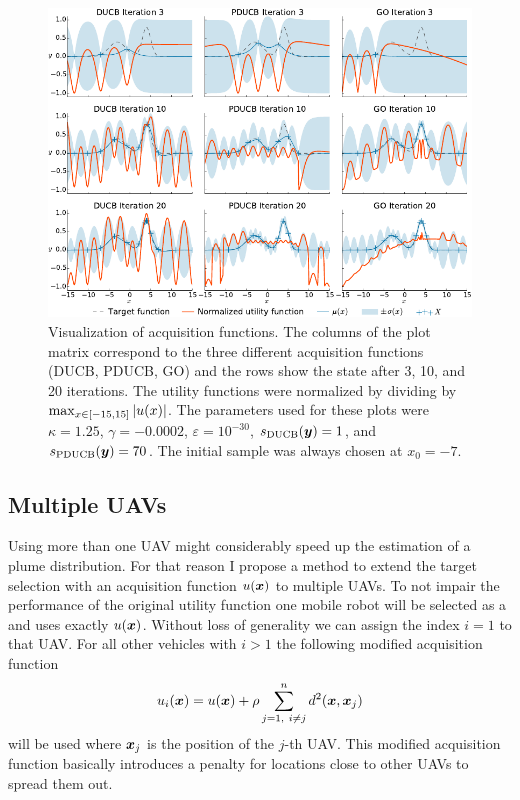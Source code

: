 \begin{figure}
    \centering
    \includegraphics{plots/acqfns}
    \caption[Visualization of acquisition functions]{Visualization of 
    acquisition functions. The columns of the plot matrix correspond to the 
    three different acquisition functions (DUCB, PDUCB, GO) and the rows show 
    the state after 3, 10, and 
        20 iterations.  The utility functions were normalized by dividing by 
           $\max_{x \in \intcc{-15, 15}} \abs[0]{u(x)}$.
        The parameters used for these plots were $\kappa = 1.25$, $\gamma 
        = -0.0002$, $\varepsilon = 10^{-30}$, $s_{\mathrm{DUCB}}(\bm{y}) = 1$, and 
        $s_{\mathrm{PDUCB}}(\bm{y}) = 70$. The initial sample was always chosen at $x_0 
        = -7$.}\label{fig:acqfns}
\end{figure}

\subsection{Multiple UAVs}\label{sec:multiple-uavs}
Using more than one UAV might considerably speed up the estimation of a plume 
distribution. For that reason I propose a method to extend the target selection 
with an acquisition function $u(\bm{x})$ to multiple UAVs. To not impair the 
performance of the original utility function one mobile robot will be selected 
as a  and uses exactly $u(\bm{x})$. Without loss of 
generality we can assign the index $i = 1$ to that UAV\@. For all other vehicles 
with $i > 1$ the following modified acquisition function
\begin{equation}
    u_i(\bm{x}) = u(\bm{x}) + \rho \sum_{j = 1,\ i \neq j}^n d^2(\bm{x}, \bm{x}_j)
\end{equation}
will be used where $\bm{x}_j$ is the position of the $j$-th UAV\@. This modified 
acquisition function basically introduces a penalty for locations close to other 
UAVs to spread them out.

